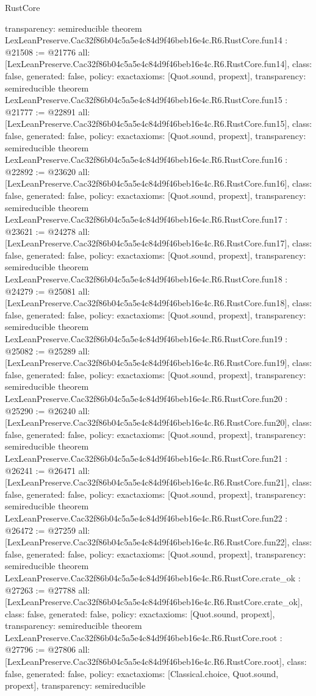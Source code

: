 \begin{lexlean}{RustCore}
\begin{coremodule}
{  transparency: semireducible
}
theorem LexLeanPreserve.Cac32f86b04c5a5e4c84d9f46beb16e4c.R6.RustCore.fun14 : @21508 := @21776 {
  all: [LexLeanPreserve.Cac32f86b04c5a5e4c84d9f46beb16e4c.R6.RustCore.fun14],
  class: false,
  generated: false,
  policy: exact{axioms: [Quot.sound, propext]},
  transparency: semireducible
}
theorem LexLeanPreserve.Cac32f86b04c5a5e4c84d9f46beb16e4c.R6.RustCore.fun15 : @21777 := @22891 {
  all: [LexLeanPreserve.Cac32f86b04c5a5e4c84d9f46beb16e4c.R6.RustCore.fun15],
  class: false,
  generated: false,
  policy: exact{axioms: [Quot.sound, propext]},
  transparency: semireducible
}
theorem LexLeanPreserve.Cac32f86b04c5a5e4c84d9f46beb16e4c.R6.RustCore.fun16 : @22892 := @23620 {
  all: [LexLeanPreserve.Cac32f86b04c5a5e4c84d9f46beb16e4c.R6.RustCore.fun16],
  class: false,
  generated: false,
  policy: exact{axioms: [Quot.sound, propext]},
  transparency: semireducible
}
theorem LexLeanPreserve.Cac32f86b04c5a5e4c84d9f46beb16e4c.R6.RustCore.fun17 : @23621 := @24278 {
  all: [LexLeanPreserve.Cac32f86b04c5a5e4c84d9f46beb16e4c.R6.RustCore.fun17],
  class: false,
  generated: false,
  policy: exact{axioms: [Quot.sound, propext]},
  transparency: semireducible
}
theorem LexLeanPreserve.Cac32f86b04c5a5e4c84d9f46beb16e4c.R6.RustCore.fun18 : @24279 := @25081 {
  all: [LexLeanPreserve.Cac32f86b04c5a5e4c84d9f46beb16e4c.R6.RustCore.fun18],
  class: false,
  generated: false,
  policy: exact{axioms: [Quot.sound, propext]},
  transparency: semireducible
}
theorem LexLeanPreserve.Cac32f86b04c5a5e4c84d9f46beb16e4c.R6.RustCore.fun19 : @25082 := @25289 {
  all: [LexLeanPreserve.Cac32f86b04c5a5e4c84d9f46beb16e4c.R6.RustCore.fun19],
  class: false,
  generated: false,
  policy: exact{axioms: [Quot.sound, propext]},
  transparency: semireducible
}
theorem LexLeanPreserve.Cac32f86b04c5a5e4c84d9f46beb16e4c.R6.RustCore.fun20 : @25290 := @26240 {
  all: [LexLeanPreserve.Cac32f86b04c5a5e4c84d9f46beb16e4c.R6.RustCore.fun20],
  class: false,
  generated: false,
  policy: exact{axioms: [Quot.sound, propext]},
  transparency: semireducible
}
theorem LexLeanPreserve.Cac32f86b04c5a5e4c84d9f46beb16e4c.R6.RustCore.fun21 : @26241 := @26471 {
  all: [LexLeanPreserve.Cac32f86b04c5a5e4c84d9f46beb16e4c.R6.RustCore.fun21],
  class: false,
  generated: false,
  policy: exact{axioms: [Quot.sound, propext]},
  transparency: semireducible
}
theorem LexLeanPreserve.Cac32f86b04c5a5e4c84d9f46beb16e4c.R6.RustCore.fun22 : @26472 := @27259 {
  all: [LexLeanPreserve.Cac32f86b04c5a5e4c84d9f46beb16e4c.R6.RustCore.fun22],
  class: false,
  generated: false,
  policy: exact{axioms: [Quot.sound, propext]},
  transparency: semireducible
}
theorem LexLeanPreserve.Cac32f86b04c5a5e4c84d9f46beb16e4c.R6.RustCore.crate_ok : @27263 := @27788 {
  all: [LexLeanPreserve.Cac32f86b04c5a5e4c84d9f46beb16e4c.R6.RustCore.crate_ok],
  class: false,
  generated: false,
  policy: exact{axioms: [Quot.sound, propext]},
  transparency: semireducible
}
theorem LexLeanPreserve.Cac32f86b04c5a5e4c84d9f46beb16e4c.R6.RustCore.root : @27796 := @27806 {
  all: [LexLeanPreserve.Cac32f86b04c5a5e4c84d9f46beb16e4c.R6.RustCore.root],
  class: false,
  generated: false,
  policy: exact{axioms: [Classical.choice, Quot.sound, propext]},
  transparency: semireducible
}


\end{coremodule}
\end{lexlean}
